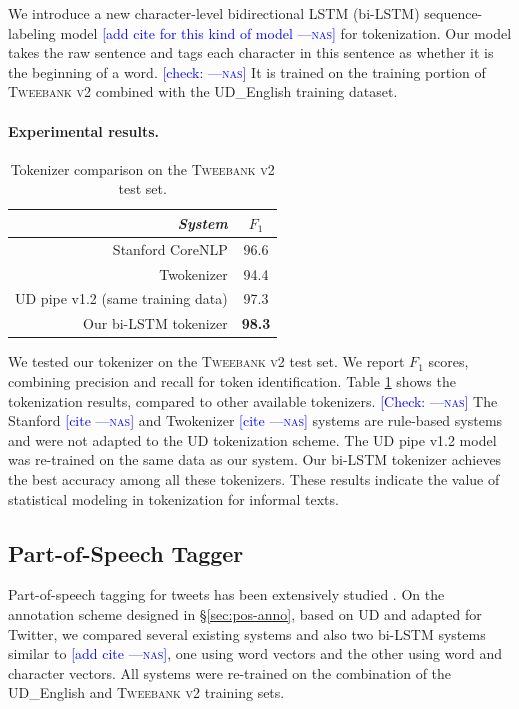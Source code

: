 \documentclass[11pt,a4paper]{article}
\newcommand{\nascomment}[1]{\textcolor{blue}{[#1 ---\textsc{nas}]}}
\begin{document}
We introduce a new
character-level bidirectional LSTM (bi-LSTM) sequence-labeling model
\nascomment{add cite for this kind of model}
for tokenization.
Our model takes the raw sentence and tags each character in this 
sentence as whether it is the beginning of a word.
\nascomment{check:} It is trained on the training portion of
\textsc{Tweebank v2} combined with the UD\_English training dataset.

\paragraph{Experimental results.}

\begin{table}[t]
	\centering
	\begin{tabular}{rc}
		\hline
		\it System & $F_1$ \\
		\hline
		Stanford CoreNLP & 96.6 \\
		Twokenizer & 94.4 \\
		UD pipe v1.2 (same training data) & 97.3 \\
		Our bi-LSTM tokenizer & \bf 98.3 \\
		\hline
	\end{tabular}
	\caption{Tokenizer comparison on the \textsc{Tweebank v2} test set.}\label{tbl:tok-result}
\end{table}

We tested our tokenizer on the \textsc{Tweebank v2} test set. 
We report $F_1$ scores, combining precision and recall for token identification. Table \ref{tbl:tok-result} shows the
tokenization results, compared to  other available tokenizers. 
\nascomment{Check:}  The Stanford \nascomment{cite}  and Twokenizer
\nascomment{cite} systems are rule-based systems and were not adapted
to the UD tokenization scheme.
The UD pipe v1.2
\cite{straka-strakova:2017:K17-3} model was re-trained on the same
data as our system.
Our bi-LSTM tokenizer achieves the best accuracy among all these
tokenizers.  These results indicate the value of statistical modeling
in tokenization for informal texts.

\subsection{Part-of-Speech Tagger}

Part-of-speech tagging for tweets has been extensively studied \cite{ritter-EtAl:2011:EMNLP,gimpel-EtAl:2011:ACL-HLT2011,owoputi-EtAl:2013:NAACL-HLT,gui-EtAl:2017:EMNLP20172}.
On the annotation scheme designed in \S\ref{sec:pos-anno}, based on UD and adapted for
Twitter, we compared several existing systems and also two bi-LSTM systems similar
to \citet{??} \nascomment{add cite}, one using word vectors and the
other using word and character vectors.   All systems were re-trained on
the combination of the UD\_English and \textsc{Tweebank v2} training sets.
\end{document}

